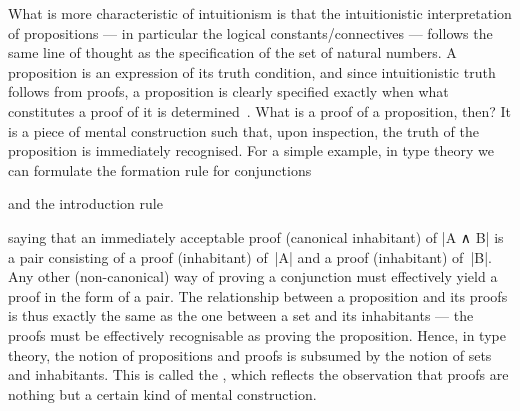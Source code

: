 What is more characteristic of intuitionism is that the intuitionistic interpretation of propositions --- in particular the logical constants/connectives --- follows the same line of thought as the specification of the set of natural numbers.
A proposition is an expression of its truth condition, and since intuitionistic truth follows from proofs, a proposition is clearly specified exactly when what constitutes a proof of it is determined~\citep{ML-truth-of-a-proposition}.
What is a proof of a proposition, then? It is a piece of mental construction such that, upon inspection, the truth of the proposition is immediately recognised.
For a simple example, in type theory we can formulate the formation rule for conjunctions
\begin{center}
 \DP
\end{center}
and the introduction rule
\begin{center}
   \DP
\end{center}
saying that an immediately acceptable proof (canonical inhabitant) of |A ∧ B| is a pair consisting of a proof (inhabitant) of~|A| and a proof (inhabitant) of~|B|.
Any other (non-canonical) way of proving a conjunction must effectively yield a proof in the form of a pair.
The relationship between a proposition and its proofs is thus exactly the same as the one between a set and its inhabitants --- the proofs must be effectively recognisable as proving the proposition.
Hence, in type theory, the notion of propositions and proofs is subsumed by the notion of sets and inhabitants.
This is called the , which reflects the observation that proofs are nothing but a certain kind of mental construction.

